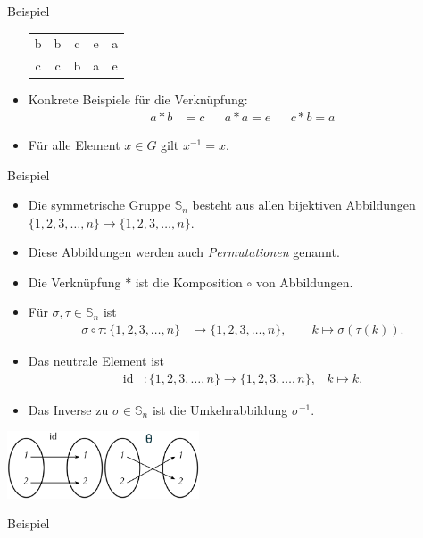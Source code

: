 \documentclass{beamer}
\renewcommand{\emph}[1]{{\textcolor{solarizedRed}{\itshape #1}}}
\renewcommand\SS{\mathbb S}
\newcommand{\id}{\mathrm{id}}
\newcommand{\ue}{\"u}
\begin{document}
\begin{frame}
\begin{overprint}
\begin{block}{Beispiel}
\begin{itemize}
\begin{center}
\begin{tabular}{c|cccc}
							b&b&c&e&a\\
							c&c&b&a&e
						\end{tabular}
					\end{center}
				\item Konkrete Beispiele f\ue r die Verkn\ue pfung:
					\begin{align*}
						a*b&=c&&a*a=e&&c*b=a
					\end{align*}
				\item F\ue r alle Element $x\in G$ gilt $x^{-1}=x$.
			\end{itemize}		
		\end{block}
		\begin{block}{Beispiel}
			\begin{itemize}
				\item Die \alert{symmetrische Gruppe} $\SS_n$ besteht aus allen bijektiven Abbildungen $\{1,2,3,\ldots,n\}\to\{1,2,3,\ldots,n\}$.
				\item Diese Abbildungen werden auch \emph{Permutationen} genannt.
				\item Die Verkn\ue pfung $*$ ist die Komposition $\circ$ von Abbildungen.
				\item F\ue r $\sigma,\tau\in\SS_n$ ist
					\begin{align*}
						\sigma\circ\tau:\{1,2,3,\ldots,n\}&\to\{1,2,3,\ldots,n\},\qquad k\mapsto\sigma(\tau(k)).
					\end{align*}
				\item Das neutrale Element ist 
					\begin{align*}
						\id&:\{1,2,3,\ldots,n\}\to\{1,2,3,\ldots,n\},&k\mapsto k.
					\end{align*}
				\item Das Inverse zu $\sigma\in\SS_n$ ist die Umkehrabbildung $\sigma^{-1}$.
			\end{itemize}	
		\end{block}
		\includegraphics[height=20mm]{pics/id.pdf}\hfill\includegraphics[height=20mm]{pics/theta.pdf}
		\begin{block}{Beispiel}

\end{block}
\end{overprint}
\end{frame}
\end{document}
